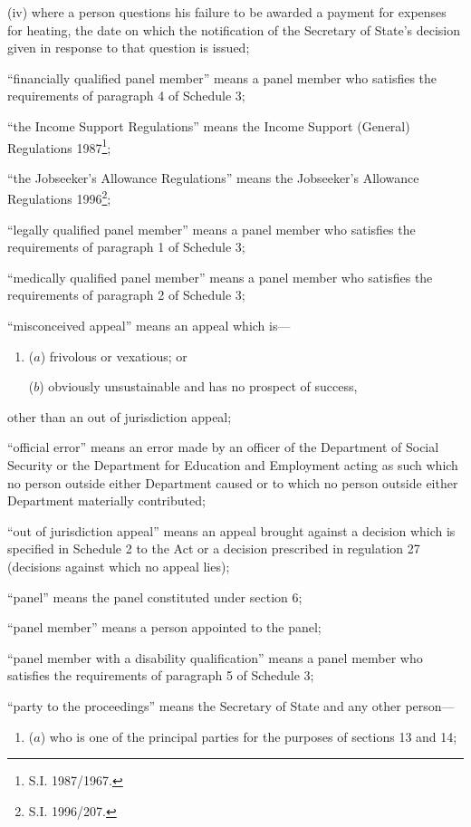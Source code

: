 \documentclass[12pt,a4paper]{article}
\begin{document}
\begin{enumerate}
\begin{enumerate}
\begin{enumerate}
(iv) where a person questions his failure to be awarded a payment for expenses for heating, the date on which the notification of the Secretary of State’s decision given in response to that question is issued;
\end{enumerate}
\end{enumerate}

“financially qualified panel member” means a panel member who satisfies the requirements of paragraph 4 of Schedule 3;

“the Income Support Regulations” means the Income Support (General) Regulations 1987\footnote{\frenchspacing S.I. 1987/1967.};

“the Jobseeker’s Allowance Regulations” means the Jobseeker’s Allowance Regulations 1996\footnote{\frenchspacing S.I. 1996/207.};

“legally qualified panel member” means a panel member who satisfies the requirements of paragraph 1 of Schedule 3;

“medically qualified panel member” means a panel member who satisfies the requirements of paragraph 2 of Schedule 3;

“misconceived appeal” means an appeal which is—
\begin{enumerate}\item[]
($a$) frivolous or vexatious; or

($b$) obviously unsustainable and has no prospect of success,
\end{enumerate}
other than an out of jurisdiction appeal;

“official error” means an error made by an officer of the Department of Social Security or the Department for Education and Employment acting as such which no person outside either Department caused or to which no person outside either Department materially contributed;

“out of jurisdiction appeal” means an appeal brought against a decision which is specified in Schedule 2 to the Act or a decision prescribed in regulation 27 (decisions against which no appeal lies);

“panel” means the panel constituted under section 6;

“panel member” means a person appointed to the panel;

“panel member with a disability qualification” means a panel member who satisfies the requirements of paragraph 5 of Schedule 3;

“party to the proceedings” means the Secretary of State and any other person—
\begin{enumerate}\item[]
($a$) who is one of the principal parties for the purposes of sections 13 and 14;


\end{enumerate}
\end{enumerate}
\end{document}

